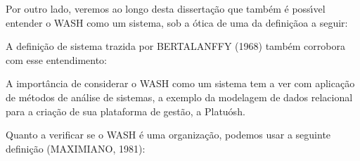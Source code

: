 \documentclass[
12pt,		%
openright,	%
twoside,  %
a4paper,			%
chapter=TITLE,		%
english,			%
french,				%
spanish,			%
brazil				%
]{USPSC-classe/USPSC}
\begin{document}
Por outro lado, veremos ao longo desta disserta\c{c}\~ao que tamb\'em \'e poss\'{\i}vel entender o WASH como um sistema, sob a \'otica de uma da defini\c{c}\~aoa a seguir:











\noindent\begin{center}\mbox{\centering{}}\end{center}


A defini\c{c}\~ao de sistema trazida por BERTALANFFY (1968) tamb\'em corrobora com esse entendimento:











\noindent\begin{center}\mbox{\centering{}}\end{center}


A import\^ancia de considerar o WASH como um sistema tem a ver com aplica\c{c}\~ao de m\'etodos de an\'alise de sistemas, a exemplo da modelagem de dados relacional para a cria\c{c}\~ao de sua plataforma de gest\~ao, a \textquotedbl Platu\'osh\textquotedbl .










Quanto a verificar se o WASH \'e uma organiza\c{c}\~ao, podemos usar a seguinte defini\c{c}\~ao  (MAXIMIANO, 1981):











\noindent\begin{center}\mbox{\centering{}}\end{center}
\end{document}
